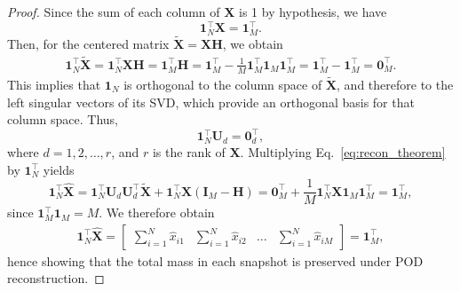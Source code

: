 \documentclass[10pt,a4paper]{amsart}
\begin{document}
\begin{proof}
Since the sum of each column of $\mathbf{X}$ is 1 by hypothesis, we have
\[
\mathbf{1}_N^\top \mathbf{X} = \mathbf{1}_M^\top.
\]
Then, for the centered matrix $\tilde{\mathbf{X}} = \mathbf{X} \mathbf{H}$, we obtain
\begin{align}
\mathbf{1}_N^\top \tilde{\mathbf{X}} = \mathbf{1}_N^\top \mathbf{X} \mathbf{H} = \mathbf{1}_M^\top \mathbf{H} = \mathbf{1}_M^\top - \frac{1}{M} \mathbf{1}_M^\top \mathbf{1}_M \mathbf{1}_M^\top = \mathbf{1}_M^\top - \mathbf{1}_M^\top = \mathbf{0}_M^\top.
\end{align}
This implies that $\mathbf{1}_{N}$ is orthogonal to the column space of $\tilde{\mathbf{X}}$, and therefore to the left singular vectors of its SVD, which provide an orthogonal basis for that column space. Thus,
\begin{equation}
    \mathbf{1}_{N}^\top \mathbf{U}_d = \boldsymbol{0}^\top_d,
\end{equation}
where $d=1,2,\dots, r$, and $r$ is the rank of $\mathbf{X}$. Multiplying Eq.~\eqref{eq:recon_theorem} by $\mathbf{1}_{N}^\top$ yields
\begin{equation}
\mathbf{1}_N^\top \hat{\mathbf{X}} = \mathbf{1}_N^\top \mathbf{U}_d \mathbf{U}_d^\top \tilde{\mathbf{X}} + \mathbf{1}_N^\top \mathbf{X} (\mathbf{I}_M - \mathbf{H})  = \mathbf{0}_M^\top + \frac{1}{M} \mathbf{1}_N^\top \mathbf{X} \mathbf{1}_M \mathbf{1}_M^\top = \mathbf{1}_M^\top,
\end{equation}
since $\mathbf{1}_M^\top \mathbf{1}_M = M$. We therefore obtain
\begin{align}
    \mathbf{1}_{N}^\top \hat{\mathbf{X}} =
    \begin{bmatrix}
    \sum_{i=1}^{N} \hat{x}_{i1} &  \sum_{i=1}^{N} \hat{x}_{i2} & \dots & \sum_{i=1}^{N} \hat{x}_{iM}  
    \end{bmatrix} = \mathbf{1}^\top_{M},
\end{align}
hence showing that the total mass in each snapshot is preserved under POD reconstruction.
\end{proof}
\end{document}
